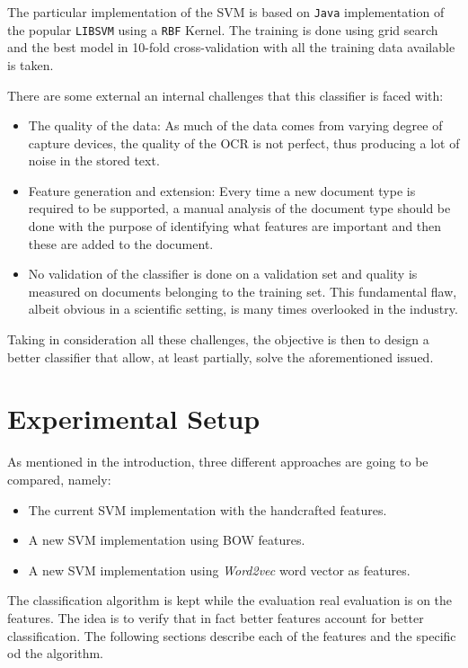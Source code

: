 The particular implementation of the \ac{SVM} is based on \texttt{Java}
implementation of the popular \texttt{LIBSVM} \cite{CC01a} using a
\texttt{RBF} Kernel.  The training is done using grid search and the best
model in 10-fold cross-validation with all the training data available is
taken.

There are some external an internal challenges that this classifier is faced
with:

\begin{itemize}
\item The quality of the data: As much of the data comes from varying degree
  of capture devices, the quality of the OCR is not perfect, thus producing a
  lot of noise in the stored text.
\item Feature generation and extension: Every time a new document type is
  required to be supported, a manual analysis of the document type should be
  done with the purpose of identifying what features are important and then
  these are added to the document.
\item No validation of the classifier is done on a validation set and quality
  is measured on documents belonging to the training set. This fundamental
  flaw, albeit obvious in a scientific setting, is many times overlooked in
  the industry.
\end{itemize}

Taking in consideration all these challenges, the objective is then to design
a better classifier that allow, at least partially, solve the
aforementioned issued.



\section{Experimental Setup}
\label{sec:w2vec_doctype_experimental_setup}

As mentioned in the introduction, three different approaches are going to be
compared, namely:

\begin{itemize}
\item The current \ac{SVM} implementation with the handcrafted features.
\item A new \ac{SVM} implementation using \ac{BOW} features.
\item A new \ac{SVM} implementation using \textit{Word2vec} word vector as features.
\end{itemize}

The classification algorithm is kept while the
evaluation real evaluation is on the features. The idea  is to verify
that in fact better features account for better classification. The following
sections describe each of the features and the specific od the algorithm. 


